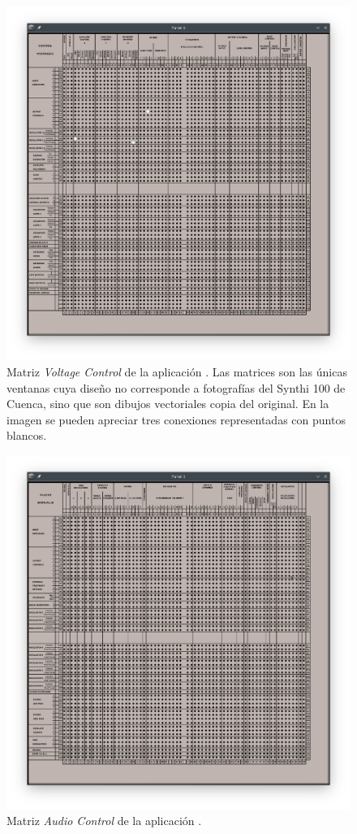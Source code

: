 \begin{figure}
	\centering
	\includegraphics[width=1\textwidth]{images/matriz_control_synthigme}
	\caption[Matriz \textit{Voltage Control} de la aplicación \appName]{Matriz \textit{Voltage Control} de la aplicación \appName. Las matrices son las únicas ventanas cuya diseño no corresponde a fotografías del Synthi 100 de Cuenca, sino que son dibujos vectoriales copia del original. En la imagen se pueden apreciar tres conexiones representadas con puntos blancos.}
	\label{fig:matriz_control_synthigme}
\end{figure}

\begin{figure}
	\centering
	\includegraphics[width=1\textwidth]{images/matriz_audio_synthigme}
	\caption[Matriz \textit{Audio Control} de la aplicación \appName]{Matriz \textit{Audio Control} de la aplicación \appName.}
	\label{fig:matriz_audio_synthigme}
\end{figure}